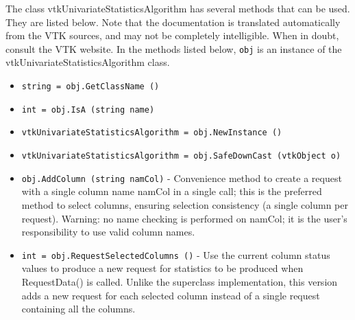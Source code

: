 The class vtkUnivariateStatisticsAlgorithm has several methods that can be used.
  They are listed below.
Note that the documentation is translated automatically from the VTK sources,
and may not be completely intelligible.  When in doubt, consult the VTK website.
In the methods listed below, \verb|obj| is an instance of the vtkUnivariateStatisticsAlgorithm class.
\begin{itemize}
\item  \verb|string = obj.GetClassName ()|

\item  \verb|int = obj.IsA (string name)|

\item  \verb|vtkUnivariateStatisticsAlgorithm = obj.NewInstance ()|

\item  \verb|vtkUnivariateStatisticsAlgorithm = obj.SafeDownCast (vtkObject o)|

\item  \verb|obj.AddColumn (string namCol)| -  Convenience method to create a request with a single column name  namCol in a single
 call; this is the preferred method to select columns, ensuring selection consistency
 (a single column per request).
 Warning: no name checking is performed on  namCol; it is the user's
 responsibility to use valid column names.

\item  \verb|int = obj.RequestSelectedColumns ()| -  Use the current column status values to produce a new request for statistics
 to be produced when RequestData() is called.
 Unlike the superclass implementation, this version adds a new request for each selected column
 instead of a single request containing all the columns.

\end{itemize}
